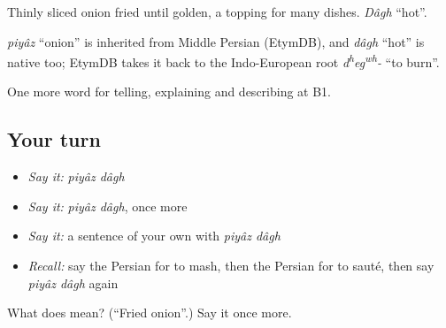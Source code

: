 Thinly sliced onion fried until golden, a topping for many dishes. \emph{Dâgh} \textquotedblleft{}hot\textquotedblright{}.

\begin{cousinweb}
\emph{piyâz} \textquotedblleft{}onion\textquotedblright{} is inherited from Middle Persian (EtymDB), and \emph{dâgh} \textquotedblleft{}hot\textquotedblright{} is native too; EtymDB takes it back to the Indo-European root \emph{d\textsuperscript{h}eg\textsuperscript{w}\textsuperscript{h}-} \textquotedblleft{}to burn\textquotedblright{}.
\end{cousinweb}

\begin{grammarlens}[title={What you've built}]
One more word for telling, explaining and describing at B1.
\end{grammarlens}

\subsection*{Your turn}
\begin{itemize}
\raggedright
  \item \emph{Say it:} \emph{piyâz dâgh}
  \item \emph{Say it:} \emph{piyâz dâgh}, once more
  \item \emph{Say it:} a sentence of your own with \emph{piyâz dâgh}
  \item \emph{Recall:} say the Persian for to mash, then the Persian for to sauté, then say \emph{piyâz dâgh} again
\end{itemize}

\begin{tcolorbox}[breakable,colback=teal!4,colframe=teal!35!black,title={Before you move on}]
What does   mean? (\textquotedblleft{}Fried onion\textquotedblright{}.) Say it once more.
\end{tcolorbox}
